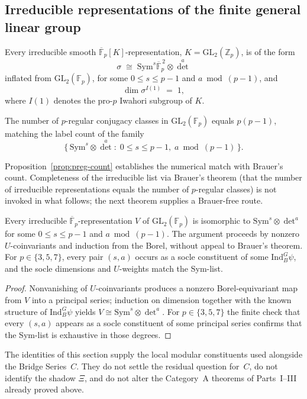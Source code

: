 \subsection{Irreducible representations of the finite general linear group}
\begin{proposition}\label{prop:irreps-k}
Every irreducible smooth $\overline{\mathbb{F}}_p[K]$-representation, $K=\mathrm{GL}_2(\mathbb{Z}_p)$, is of the form
\[
\sigma\;\cong\;\mathrm{Sym}^s\overline{\mathbb{F}}_p^{\,2}\otimes\det^a
\]
inflated from $\mathrm{GL}_2(\mathbb{F}_p)$, for some $0\le s\le p-1$ and $a\bmod(p-1)$, and
\[
\dim\sigma^{I(1)}\;=\;1,
\]
where $I(1)$ denotes the pro-$p$ Iwahori subgroup of $K$.
\end{proposition}

\begin{proposition}\label{prop:preg-count}
The number of $p$-regular conjugacy classes in $\mathrm{GL}_2(\mathbb{F}_p)$ equals $p(p-1)$, matching the label count of the family
\[
\bigl\{\,\mathrm{Sym}^s\otimes\det^a:\;0\le s\le p-1,\; a\bmod(p-1)\,\bigr\}.
\]
\end{proposition}
\begin{remark}
Proposition~\ref{prop:preg-count} establishes the numerical match with Brauer's count. Completeness of the irreducible list via Brauer's theorem (that the number of irreducible representations equals the number of $p$-regular classes) is not invoked in what follows; the next theorem supplies a Brauer-free route.
\end{remark}

\begin{theorem}\label{thm:irreps-gl2}
Every irreducible $\overline{\mathbb{F}}_p$-representation $V$ of $\mathrm{GL}_2(\mathbb{F}_p)$ is isomorphic to $\mathrm{Sym}^s\otimes\det^a$ for some $0\le s\le p-1$ and $a\bmod(p-1)$. The argument proceeds by nonzero $U$-coinvariants and induction from the Borel, without appeal to Brauer's theorem. For $p\in\{3,5,7\}$, every pair $(s,a)$ occurs as a socle constituent of some $\mathrm{Ind}_B^G\psi$, and the socle dimensions and $U$-weights match the Sym-list.
\end{theorem}
\begin{proof}
Nonvanishing of $U$-coinvariants produces a nonzero Borel-equivariant map from $V$ into a principal series; induction on dimension together with the known structure of $\mathrm{Ind}_B^G\psi$ yields $V\cong\mathrm{Sym}^s\otimes\det^a$. For $p\in\{3,5,7\}$ the finite check that every $(s,a)$ appears as a socle constituent of some principal series confirms that the Sym-list is exhaustive in those degrees.
\end{proof}

\begin{remark}[Scope]
The identities of this section supply the local modular constituents used alongside the Bridge Series~$C$. They do not settle the residual question for~$C$, do not identify the shadow $\Xi$, and do not alter the Category~A theorems of Parts~I--III already proved above.
\end{remark}
